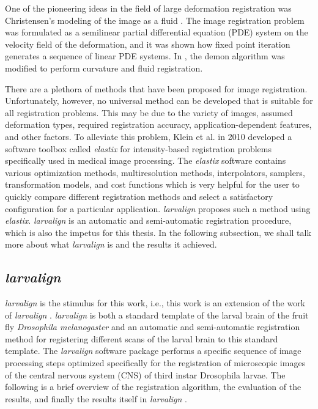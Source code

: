\documentclass{report}
\begin{document}
	One of the pioneering ideas in the field of large deformation registration was Christensen's modeling of the image as a fluid \cite{536892}. The image registration problem was formulated as a semilinear partial differential equation (PDE) system on the velocity field of the deformation, and it was shown how fixed point iteration generates a sequence of linear PDE systems. In \cite{5193151}, the demon algorithm was modified to perform curvature and fluid registration.
	
	There are a plethora of methods that have been proposed for image registration. Unfortunately, however, no universal method can be developed that is suitable for all registration problems. This may be due to the variety of images, assumed deformation types, required registration accuracy, application-dependent features, and other factors. To alleviate this problem, Klein et al. \cite{5338015} in 2010 developed a software toolbox called \emph{elastix} for intensity-based registration problems specifically used in medical image processing. The \emph{elastix} software contains various optimization methods, multiresolution methods, interpolators, samplers, transformation models, and cost functions which is very helpful for the user to quickly compare different registration methods and select a satisfactory configuration for a particular application. \emph{{larvalign}} \cite{larvalign} proposes such a method using \emph{elastix}. \emph{{larvalign}} \cite{larvalign} is an automatic and semi-automatic registration procedure, which is also the impetus for this thesis. In the following subsection, we shall talk more about what \emph{{larvalign}} is and the results it achieved.
	
	\subsection{\emph{larvalign}}
	\emph{{larvalign}} \cite{larvalign} is the stimulus for this work, i.e., this work is an extension of the work of \emph{{larvalign}} \cite{larvalign}. \emph{{larvalign}} \cite{larvalign} is both a standard template of the larval brain of the fruit fly \emph{Drosophila melanogaster} and an automatic and semi-automatic registration method for registering different scans of the larval brain to this standard template. The \emph{{larvalign}} \cite{larvalign} software package performs a specific sequence of image processing steps optimized specifically for the registration of microscopic images of the central nervous system (CNS) of third instar Drosophila larvae. The following is a brief overview of the registration algorithm, the evaluation of the results, and finally the results itself in \emph{{larvalign}} \cite{larvalign}.
	
\end{document}
